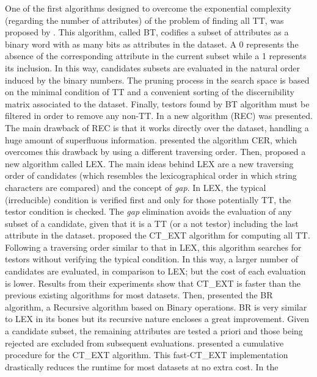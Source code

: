 \documentclass[authoryear,preprint,review,12pt]{elsarticle}
\begin{document}
    One of the first algorithms designed to overcome the exponential complexity (regarding
  the number of attributes) of the problem of finding all TT, was 
  proposed by \cite{Ruiz85}. This algorithm, called BT,
  codifies a subset of attributes as a binary word with as many bits as attributes in the 
  dataset. A 0 represents the absence of the corresponding attribute in the current
  subset while a 1 represents its inclusion. In this way, candidates subsets are evaluated
  in the natural order induced by the binary numbers. The pruning process in the
  search space is based on the minimal condition of TT and a convenient sorting
  of the discernibility matrix associated to the dataset. Finally, 
  testors found by BT algorithm must be filtered in order to remove any non-TT.
  In \citep{Shulcloper95b} a new algorithm (REC) was presented.
  The main drawback of REC is that it works directly over the dataset, handling a huge amount of superfluous
  information. \cite{Ayaquica97} presented the algorithm CER, which overcomes this drawback by using a different
  traversing order.  Then, \cite{Santiesteban03} proposed a new algorithm called LEX. The main ideas 
  behind LEX are a new traversing order of candidates (which resembles the
  lexicographical order in which string characters are compared) and the concept of \emph{gap}. In LEX,
  the typical (irreducible) condition is verified first and only for those potentially TT, the testor 
  condition is checked. The \emph{gap} elimination avoids the evaluation of any subset of a candidate, given 
  that it is a TT (or a not testor) including the last attribute in the dataset.
  \cite{Sanchez07} proposed the CT\_EXT algorithm for computing all
  TT. Following a traversing order similar to that in LEX, this algorithm searches for
  testors without verifying the typical condition. In this way, a larger number of candidates are 
  evaluated, in comparison to LEX; but the cost of each evaluation is lower. Results from their experiments
  show that CT\_EXT is faster than the previous existing algorithms for most datasets. Then, \cite{Lias09}
  presented the BR algorithm, a Recursive algorithm based on 
  Binary operations. BR is very similar to LEX in its bones but its recursive nature encloses a great
  improvement. Given a candidate subset, the remaining attributes are tested a priori and those being 
  rejected are excluded from subsequent evaluations. \cite{Sanchez10} presented a cumulative
  procedure for the CT\_EXT algorithm. This fast-CT\_EXT implementation drastically reduces the runtime
  for most datasets at no extra cost. In \citep{Lias13} the
\end{document}
